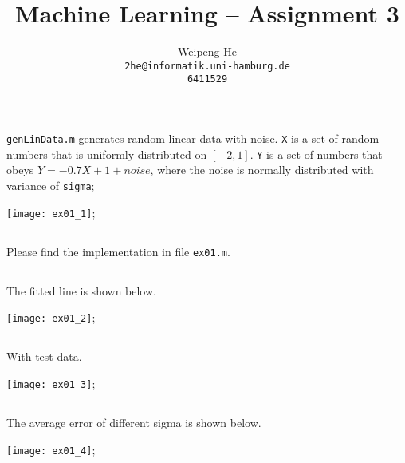 \documentclass{article}[11pt]
\title{Machine Learning -- Assignment 3}
\author{Weipeng He \\ \texttt{2he@informatik.uni-hamburg.de} \\ \texttt{6411529}}
\begin{document}
\maketitle

\section{}
\subsection{}
\texttt{genLinData.m} generates random linear data with noise. \texttt{X} is a set of random numbers that is uniformly distributed on $[-2, 1]$. \texttt{Y} is a set of numbers that obeys $Y = -0.7X + 1 + noise$, where the noise is normally distributed with variance of \texttt{sigma};

\begin{center}
  \texttt{[image: ex01\_1]};
\end{center}

\subsection{}
Please find the implementation in file \texttt{ex01.m}.

\subsection{}
The fitted line is shown below.

\begin{center}
  \texttt{[image: ex01\_2]};
\end{center}

\subsection{}
With test data.

\begin{center}
  \texttt{[image: ex01\_3]};
\end{center}

\subsection{}
The average error of different sigma is shown below.

\begin{center}
  \texttt{[image: ex01\_4]};
\end{center}
\end{document}

